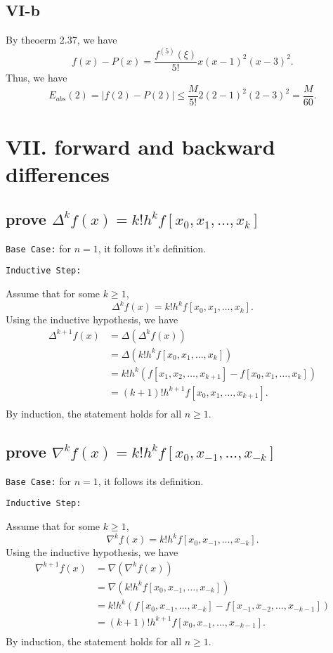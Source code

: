\documentclass[a4paper]{article}
\begin{document}
\subsection*{VI-b}
By theoerm 2.37, we have
\[
f(x) - P(x) = \frac{f^{(5)}(\xi)}{5!}x(x-1)^2(x-3)^2.
\]
Thus, we have\[
E_{abs}(2) = |f(2) - P(2)| \leq \frac{M}{5!}2(2-1)^2(2-3)^2 = \frac{M}{60}.
\]

\section*{VII. forward and backward differences}
\subsection*{prove $\Delta^kf(x) = k!h^kf[x_0,x_1,\dots,x_k]$}
\texttt{Base Case:}
for $n = 1$, it follows it's definition.

\texttt{Inductive Step:}

Assume that for some $k \geq 1$,
\[
\Delta^kf(x) = k!h^kf[x_0,x_1,\dots,x_k].
\]
Using the inductive hypothesis, we have
\begin{align*}
    \Delta^{k+1}f(x) &= \Delta(\Delta^kf(x)) \\
    &= \Delta(k!h^kf[x_0,x_1,\dots,x_k]) \\
    &= k!h^k(f[x_1,x_2,\dots,x_{k+1}]-f[x_0,x_1,\dots,x_k]) \\
    &= (k+1)!h^{k+1}f[x_0,x_1,\dots,x_{k+1}].\\
\end{align*}
By induction, the statement holds for all $n \geq 1$.

\subsection*{prove $\nabla ^kf(x) = k!h^kf[x_0,x_{-1},\dots,x_{-k}]$}
\texttt{Base Case:}
for $n = 1$, it follows its definition.

\texttt{Inductive Step:}

Assume that for some $k \geq 1$,
\[
\nabla^kf(x) = k!h^kf[x_0,x_{-1},\dots,x_{-k}].
\]
Using the inductive hypothesis, we have
\begin{align*}
    \nabla^{k+1}f(x) &= \nabla(\nabla^kf(x)) \\
    &= \nabla(k!h^kf[x_0,x_{-1},\dots,x_{-k}]) \\
    &= k!h^k(f[x_0,x_{-1},\dots,x_{-k}]-f[x_{-1},x_{-2},\dots,x_{-k-1}]) \\
    &= (k+1)!h^{k+1}f[x_0,x_{-1},\dots,x_{-k-1}].\\
\end{align*}
By induction, the statement holds for all $n \geq 1$.
\end{document}
